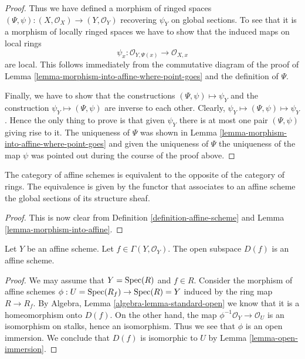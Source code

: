 \begin{proof}
\medskip\noindent
Thus we have defined a morphism of ringed spaces
$(\Psi, \psi) : (X, \mathcal{O}_X) \to (Y, \mathcal{O}_Y)$
recovering $\psi_Y$ on global sections. To see that it is
a morphism of locally ringed spaces we have to show that
the induced maps on local rings
$$
\psi_x : \mathcal{O}_{Y, \Psi(x)} \longrightarrow \mathcal{O}_{X, x}
$$
are local. This follows immediately from the commutative diagram
of the proof of Lemma \ref{lemma-morphism-into-affine-where-point-goes}
and the definition of $\Psi$.

\medskip\noindent
Finally, we have to show that the constructions
$(\Psi, \psi) \mapsto \psi_Y$ and the construction
$\psi_Y \mapsto (\Psi, \psi)$ are inverse to each other.
Clearly, $\psi_Y \mapsto (\Psi, \psi) \mapsto \psi_Y$.
Hence the only thing to prove is that given $\psi_Y$
there is at most one pair $(\Psi, \psi)$ giving rise
to it. The uniqueness of $\Psi$ was shown in Lemma
\ref{lemma-morphism-into-affine-where-point-goes} and
given the uniqueness of $\Psi$ the uniqueness of the
map $\psi$ was pointed out during the course of the proof
above.
\end{proof}

\begin{lemma}
\label{lemma-category-affine-schemes}
The category of affine schemes is equivalent to the opposite of the
category of rings. The equivalence is given by the functor that associates
to an affine scheme the global sections of its structure sheaf.
\end{lemma}

\begin{proof}
This is now clear from Definition \ref{definition-affine-scheme}
and Lemma \ref{lemma-morphism-into-affine}.
\end{proof}

\begin{lemma}
\label{lemma-standard-open-affine}
Let $Y$ be an affine scheme.
Let $f \in \Gamma(Y, \mathcal{O}_Y)$.
The open subspace $D(f)$ is an affine scheme.
\end{lemma}

\begin{proof}
We may assume that $Y = \mathop{\mathrm{Spec}}(R)$ and $f \in R$.
Consider the morphism of affine schemes
$\phi : U = \mathop{\mathrm{Spec}}(R_f) \to \mathop{\mathrm{Spec}}(R) = Y$ induced by the ring
map $R \to R_f$. By Algebra, Lemma \ref{algebra-lemma-standard-open}
we know that it is a homeomorphism onto $D(f)$.
On the other hand, the map $\phi^{-1}\mathcal{O}_Y \to \mathcal{O}_U$
is an isomorphism on stalks, hence an isomorphism. Thus we see
that $\phi$ is an open immersion. We conclude that $D(f)$
is isomorphic to $U$ by Lemma \ref{lemma-open-immersion}.
\end{proof}

